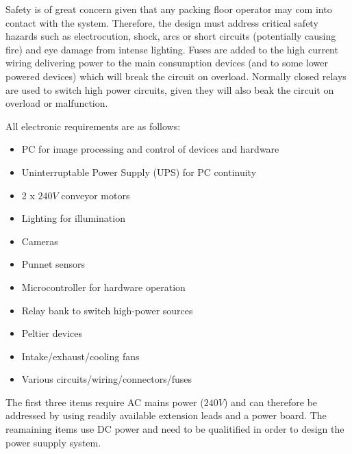 \documentclass[fleqn,twoside]{article}
\begin{document}
Safety is of great concern given that any packing floor operator may com into contact with the system. Therefore, the design must address critical safety hazards such as electrocution, shock, arcs or short circuits (potentially causing fire) and eye damage from intense lighting. Fuses are added to the high current wiring delivering power to the main consumption devices (and to some lower powered devices) which will break the circuit on overload. Normally closed relays are used to switch high power circuits, given they will also beak the circuit on overload or malfunction.  


All electronic requirements are as follows:



\begin{itemize}
	\item PC for image processing and control of devices and hardware
	\item Uninterruptable Power Supply (UPS) for PC continuity
	\item 2 x $240V$ conveyor motors
	\item Lighting for illumination
	\item Cameras 
	\item Punnet sensors
	\item Microcontroller for hardware operation
	\item Relay bank to switch high-power sources
	\item Peltier devices
	\item Intake/exhaust/cooling fans
	\item Various circuits/wiring/connectors/fuses
\end{itemize} 

The first three items require AC mains power ($240V$) and can therefore be addressed by using readily available extension leads and a power board. The reamaining items use DC power and need to be qualitified in order to design the power suupply system.
\end{document}
